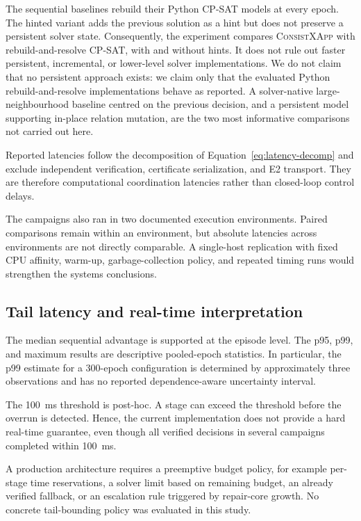 \documentclass[pdflatex,sn-mathphys-num,iicol,oneside]{sn-jnl}
\newcommand{\method}{\textsc{ConsistXApp}\xspace}
\newcommand{\cpsat}{\textsc{CP-SAT}\xspace}
\begin{document}
The sequential baselines rebuild their Python \cpsat models at every
epoch. The hinted variant adds the previous solution as a hint but
does not preserve a persistent solver state. Consequently, the
experiment compares \method with rebuild-and-resolve \cpsat, with and
without hints. It does not rule out faster persistent, incremental, or
lower-level solver implementations. We do not claim that no persistent
approach exists: we claim only that the evaluated Python
rebuild-and-resolve implementations behave as reported. A solver-native
large-neighbourhood baseline centred on the previous decision, and a
persistent model supporting in-place relation mutation, are the two
most informative comparisons not carried out here.

Reported latencies follow the decomposition of
Equation~\eqref{eq:latency-decomp} and exclude independent
verification, certificate serialization, and E2 transport. They are
therefore computational coordination latencies rather than
closed-loop control delays.

The campaigns also ran in two documented execution environments.
Paired comparisons remain within an environment, but absolute
latencies across environments are not directly comparable. A
single-host replication with fixed CPU affinity, warm-up,
garbage-collection policy, and repeated timing runs would strengthen
the systems conclusions.

\subsection{Tail latency and real-time interpretation}

The median sequential advantage is supported at the episode level.
The p95, p99, and maximum results are descriptive pooled-epoch
statistics. In particular, the p99 estimate for a 300-epoch
configuration is determined by approximately three observations and
has no reported dependence-aware uncertainty interval.

The 100~ms threshold is post-hoc. A stage can exceed the threshold
before the overrun is detected. Hence, the current implementation
does not provide a hard real-time guarantee, even though all verified
decisions in several campaigns completed within 100~ms.

A production architecture requires a preemptive budget policy, for
example per-stage time reservations, a solver limit based on remaining
budget, an already verified fallback, or an escalation rule triggered
by repair-core growth. No concrete tail-bounding policy was evaluated
in this study.
\end{document}
